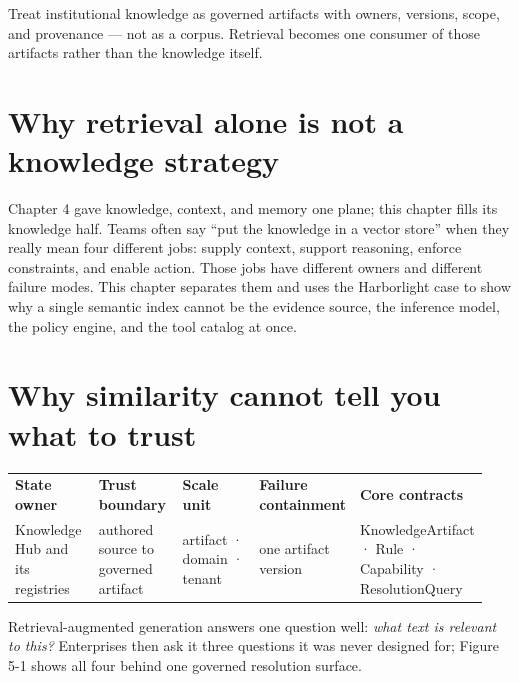 \begin{bookcallout}
Treat institutional knowledge as governed artifacts with owners, versions, scope, and provenance — not as a corpus. Retrieval becomes one consumer of those artifacts rather than the knowledge itself.
\end{bookcallout}

\section{Why retrieval alone is not a knowledge strategy}

Chapter 4 gave knowledge, context, and memory one plane; this chapter fills its knowledge half. Teams often say “put the knowledge in a vector store” when they really mean four different jobs: supply context, support reasoning, enforce constraints, and enable action. Those jobs have different owners and different failure modes. This chapter separates them and uses the Harborlight case to show why a single semantic index cannot be the evidence source, the inference model, the policy engine, and the tool catalog at once.\par

\section{Why similarity cannot tell you what to trust}


\BookTableStart
\fontsize{7.2}{9}\selectfont
\begin{tabular}{@{}Y{0.1880\linewidth}Y{0.1880\linewidth}Y{0.1880\linewidth}Y{0.1880\linewidth}Y{0.1880\linewidth}@{}}
\color{white}\bfseries State owner & \color{white}\bfseries Trust boundary & \color{white}\bfseries Scale unit & \color{white}\bfseries Failure containment & \color{white}\bfseries Core contracts \\
Knowledge Hub and its registries & authored source to governed artifact & artifact · domain · tenant & one artifact version & KnowledgeArtifact · Rule · Capability · ResolutionQuery \\
\end{tabular}
\BookTableEnd

Retrieval-augmented generation answers one question well: \emph{what text is relevant to this?} Enterprises then ask it three questions it was never designed for; Figure 5-1 shows all four behind one governed resolution surface.\par

